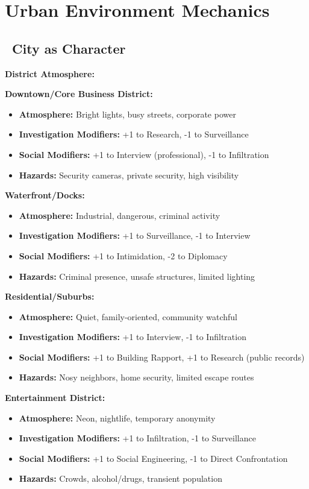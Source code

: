 \documentclass[11pt]{article}
\begin{document}
\newpage

\section{Urban Environment Mechanics}

\subsection*{\faCity\ City as Character}

\textbf{District Atmosphere:}

\textbf{Downtown/Core Business District:}
\begin{itemize}
    \item \textbf{Atmosphere:} Bright lights, busy streets, corporate power
    \item \textbf{Investigation Modifiers:} +1 to Research, -1 to Surveillance
    \item \textbf{Social Modifiers:} +1 to Interview (professional), -1 to Infiltration
    \item \textbf{Hazards:} Security cameras, private security, high visibility
\end{itemize}

\textbf{Waterfront/Docks:}
\begin{itemize}
    \item \textbf{Atmosphere:} Industrial, dangerous, criminal activity
    \item \textbf{Investigation Modifiers:} +1 to Surveillance, -1 to Interview
    \item \textbf{Social Modifiers:} +1 to Intimidation, -2 to Diplomacy
    \item \textbf{Hazards:} Criminal presence, unsafe structures, limited lighting
\end{itemize}

\textbf{Residential/Suburbs:}
\begin{itemize}
    \item \textbf{Atmosphere:} Quiet, family-oriented, community watchful
    \item \textbf{Investigation Modifiers:} +1 to Interview, -1 to Infiltration
    \item \textbf{Social Modifiers:} +1 to Building Rapport, +1 to Research (public records)
    \item \textbf{Hazards:} Nosy neighbors, home security, limited escape routes
\end{itemize}

\textbf{Entertainment District:}
\begin{itemize}
    \item \textbf{Atmosphere:} Neon, nightlife, temporary anonymity
    \item \textbf{Investigation Modifiers:} +1 to Infiltration, -1 to Surveillance
    \item \textbf{Social Modifiers:} +1 to Social Engineering, -1 to Direct Confrontation
    \item \textbf{Hazards:} Crowds, alcohol/drugs, transient population
\end{itemize}
\end{document}
